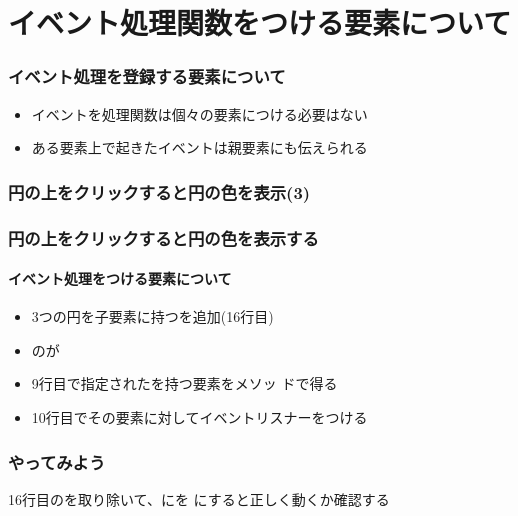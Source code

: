 \section{イベント処理関数をつける要素について}
\begin{frame}[containsverbatim]
 \frametitle{イベント処理を登録する要素について}
\begin{itemize}
 \item イベントを処理関数は個々の要素につける必要はない
 \item ある要素上で起きたイベントは親要素にも伝えられる
\end{itemize}
\end{frame}
\begin{frame}[containsverbatim]
 \frametitle{円の上をクリックすると円の色を表示(3)%
 }
\end{frame}
\begin{frame}[containsverbatim]
 \frametitle{円の上をクリックすると円の色を表示する}
 \framesubtitle{イベント処理をつける要素について}
\begin{itemize}
 \item 3つの円を子要素に持つを追加(16行目)
 \item {}のが
 \item 9行目で指定されたを持つ要素をメソッ
       ドで得る
 \item 10行目でその要素に対してイベントリスナーをつける
\end{itemize}
\end{frame}
\begin{frame}[containsverbatim]
 \frametitle{やってみよう}
 16行目のを取り除いて、にを
				にすると正しく動くか確認する
\end{frame}
